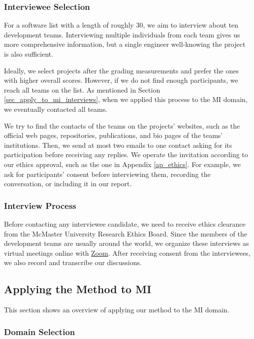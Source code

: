\documentclass[3p, 12pt,authoryear]{elsarticle}
\begin{document}
\subsubsection{Interviewee Selection} \label{sec_interviewee_selection}

For a software list with a length of roughly 30, we aim to interview about ten
development teams. Interviewing multiple individuals from each team gives us
more comprehensive information, but a single engineer well-knowing the project
is also sufficient.

Ideally, we select projects after the grading measurements and prefer the ones
with higher overall scores. However, if we do not find enough participants, we
reach all teams on the list. As mentioned in Section
\ref{sec_apply_to_mi_interviews}, when we applied this process to the MI domain,
we eventually contacted all teams.

We try to find the contacts of the teams on the projects' websites, such as the
official web pages, repositories, publications, and bio pages of the teams'
institutions. Then, we send at most two emails to one contact asking for its
participation before receiving any replies. We operate the invitation according
to our ethics approval, such as the one in Appendix \ref{ap_ethics}. For
example, we ask for participants' consent before interviewing them, recording
the conversation, or including it in our report.

\subsubsection{Interview Process} \label{sec_interview_process}

Before contacting any interviewee candidate, we need to receive ethics clearance
from the McMaster University Research Ethics Board. Since the members of the
development teams are usually around the world, we organize these interviews as
virtual meetings online with \hyperlink{https://zoom.us/}{Zoom}. After receiving
consent from the interviewees, we also record and transcribe our discussions.

\subsection{Applying the Method to MI} \label{sec_applying_method}

This section shows an overview of applying our method to the MI domain.

\subsubsection{Domain Selection}
\end{document}
